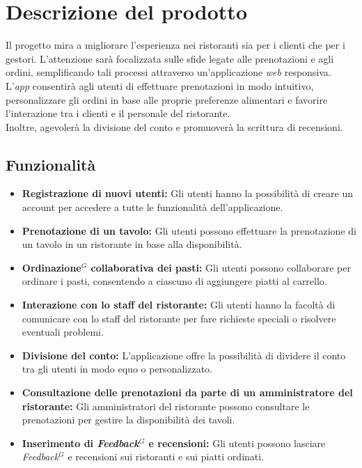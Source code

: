 \section{Descrizione del prodotto}
Il progetto mira a migliorare l'esperienza nei ristoranti sia per i clienti che per i gestori.
L'attenzione sarà focalizzata sulle sfide legate alle prenotazioni e agli ordini, semplificando tali
processi attraverso un'applicazione \textit{web} responsiva.
L'\textit{app} consentirà agli utenti di effettuare prenotazioni in modo intuitivo, personalizzare
gli ordini in base alle proprie preferenze alimentari e favorire l'interazione tra i clienti e
il personale del ristorante. \\
Inoltre, agevolerà la divisione del conto e promuoverà la scrittura di recensioni.


\subsection{Funzionalità}

\begin{itemize}
	\item \textbf{Registrazione di nuovi utenti:} Gli utenti hanno la possibilità di creare un account per accedere a tutte le funzionalità dell'applicazione.
	\item \textbf{Prenotazione di un tavolo:} Gli utenti possono effettuare la prenotazione di un tavolo in un ristorante in base alla disponibilità.
	\item \textbf{\gls{Ordinazione}$^G$ collaborativa dei pasti:} Gli utenti possono collaborare per ordinare i pasti, consentendo a ciascuno di aggiungere piatti al carrello.
	\item \textbf{Interazione con lo staff del ristorante:} Gli utenti hanno la facoltà di comunicare con lo staff del ristorante per fare richieste speciali o risolvere eventuali problemi.
	\item \textbf{Divisione del conto:} L'applicazione offre la possibilità di dividere il conto tra gli utenti in modo equo o personalizzato.
	\item \textbf{Consultazione delle prenotazioni da parte di un amministratore del ristorante:} Gli amministratori del ristorante possono consultare le prenotazioni per gestire la disponibilità dei tavoli.
	\item \textbf{Inserimento di \textit{\gls{Feedback}$^G$} e recensioni:} Gli utenti possono lasciare \textit{\gls{Feedback}$^G$} e recensioni sui ristoranti e sui piatti ordinati.
\end{itemize}
